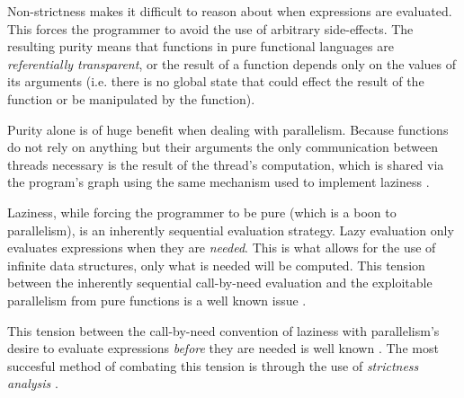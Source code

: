 Non-strictness
makes it difficult to reason about when expressions are evaluated. This forces
the programmer to avoid the use of arbitrary side-effects. The resulting purity
means that functions in pure functional languages are \emph{referentially
transparent}, or the result of a function depends only on the values of its
arguments (i.e.  there is no global state that could effect the result of the
function or be manipulated by the function).

Purity alone is of huge benefit when dealing with parallelism. Because
functions do not rely on anything but their arguments the only communication
between threads necessary is the result of the thread's computation, which is
shared via the program's graph using the same mechanism used to implement
laziness \citep{SPJ:PIFPL}.

Laziness, while forcing the programmer to be pure (which is a boon to
parallelism), is an inherently sequential evaluation strategy. Lazy evaluation
only evaluates expressions when they are \emph{needed}. This is what allows for
the use of infinite data structures, only what is needed will be computed.
This tension between the inherently sequential call-by-need evaluation and the
exploitable parallelism from pure functions is a well known issue
\cite{tremblay1995impact}.

This tension between the call-by-need convention of laziness with parallelism's
desire to evaluate expressions \emph{before} they are needed is well known
\citep{tremblay1995impact}. The most succesful method of combating this tension
is through the use of \emph{strictness analysis} \citep{mycroft1980theory,
wadler1987projections, hinze1995projection}.
